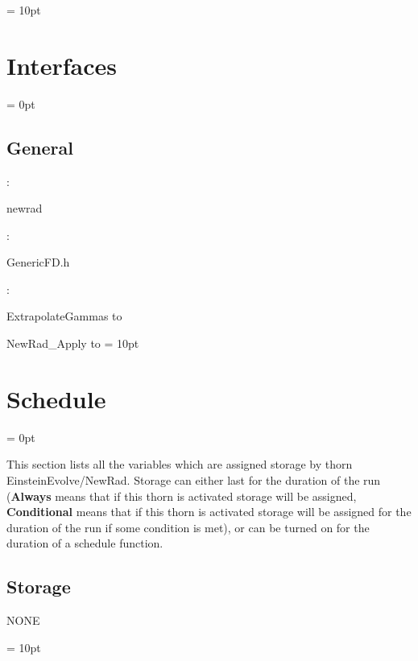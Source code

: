 \vspace{0.5cm}\parskip = 10pt 

\section{Interfaces} 


\parskip = 0pt

\vspace{3mm} \subsection*{General}

: 

newrad
\vspace{2mm}

\vspace{5mm}

: 

GenericFD.h
\vspace{2mm}

: 



ExtrapolateGammas to 

NewRad\_Apply to 
\vspace{2mm}\parskip = 10pt 

\section{Schedule} 


\parskip = 0pt


\noindent This section lists all the variables which are assigned storage by thorn EinsteinEvolve/NewRad.  Storage can either last for the duration of the run ({\bf Always} means that if this thorn is activated storage will be assigned, {\bf Conditional} means that if this thorn is activated storage will be assigned for the duration of the run if some condition is met), or can be turned on for the duration of a schedule function.


\subsection*{Storage}NONE

\vspace{5mm}\parskip = 10pt 

